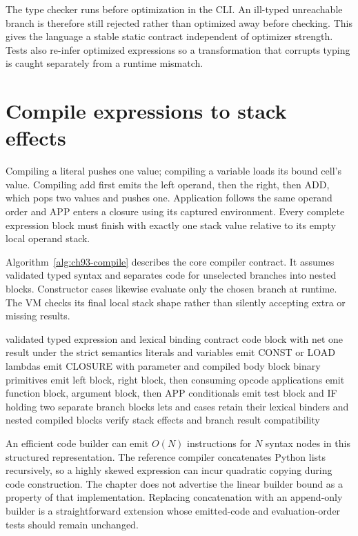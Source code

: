 The type checker runs before optimization in the CLI.
An ill-typed unreachable branch is therefore still rejected rather than optimized away before checking.
This gives the language a stable static contract independent of optimizer strength.
Tests also re-infer optimized expressions so a transformation that corrupts typing is caught separately from a runtime mismatch.

\section{Compile expressions to stack effects}
\label{sec:ch93-code}
Compiling a literal pushes one value; compiling a variable loads its bound cell's value.
Compiling add first emits the left operand, then the right, then ADD, which pops two values and pushes one.
Application follows the same operand order and APP enters a closure using its captured environment.
Every complete expression block must finish with exactly one stack value relative to its empty local operand stack.

Algorithm~\ref{alg:ch93-compile} describes the core compiler contract.
It assumes validated typed syntax and separates code for unselected branches into nested blocks.
Constructor cases likewise evaluate only the chosen branch at runtime.
The VM checks its final local stack shape rather than silently accepting extra or missing results.

\begin{algorithm}[htbp]
\caption{Compile a typed expression into structured code producing one value.}
\label{alg:ch93-compile}
\begin{pseudocode}
\Require validated typed expression and lexical binding contract
\Ensure code block with net one result under the strict semantics
\State literals and variables emit CONST or LOAD
\State lambdas emit CLOSURE with parameter and compiled body block
\State binary primitives emit left block, right block, then consuming opcode
\State applications emit function block, argument block, then APP
\State conditionals emit test block and IF holding two separate branch blocks
\State lets and cases retain their lexical binders and nested compiled blocks
\State verify stack effects and branch result compatibility
\end{pseudocode}
\end{algorithm}

An efficient code builder can emit $O(N)$ instructions for $N$ syntax nodes in this structured representation.
The reference compiler concatenates Python lists recursively, so a highly skewed expression can incur quadratic copying during code construction.
The chapter does not advertise the linear builder bound as a property of that implementation.
Replacing concatenation with an append-only builder is a straightforward extension whose emitted-code and evaluation-order tests should remain unchanged.

